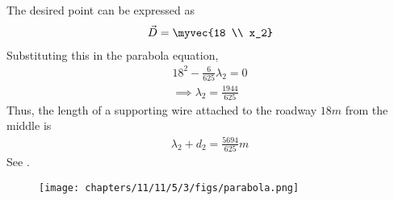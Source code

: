 The desired point can be expressed as
\begin{align}
	\vec{D} = \myvec{18 \\ x_2}
\end{align}
Substituting this in the parabola equation,
\begin{align}
    18^2 - \frac{6}{625}\lambda_2 = 0
    \\
\implies \lambda_2 = \frac{1944}{625}
\end{align}
Thus, the length of a supporting wire attached to the roadway $18 m$ from the middle is 
\begin{align}
     \lambda_2 + d_2 = \frac{5694}{625} m   
\end{align}
See  
    .
\begin{figure}[H]
    \centering
    \texttt{[image: chapters/11/11/5/3/figs/parabola.png]}
    \caption{}
    \label{fig:chapters/11/11/5/3/parabola}
\end{figure}

